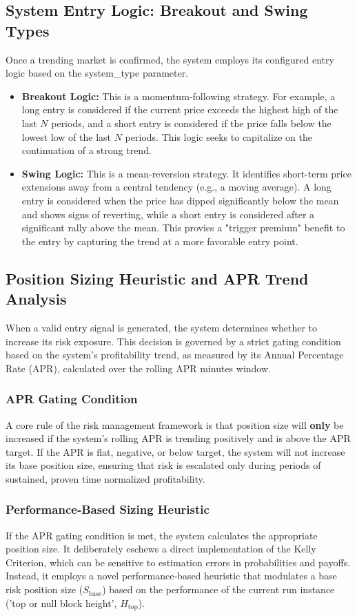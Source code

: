 \documentclass[10pt]{article}
\begin{document}
\subsection{System Entry Logic: Breakout and Swing Types}
Once a trending market is confirmed, the system employs its configured entry logic based on the system\_type parameter.
\begin{itemize}
    \item \textbf{Breakout Logic:} This is a momentum-following strategy. For example, a long entry is considered if the current price exceeds the highest high of the last $N$ periods, and a short entry is considered if the price falls below the lowest low of the last $N$ periods. This logic seeks to capitalize on the continuation of a strong trend.
    \item \textbf{Swing Logic:} This is a mean-reversion strategy. It identifies short-term price extensions away from a central tendency (e.g., a moving average). A long entry is considered when the price has dipped significantly below the mean and shows signs of reverting, while a short entry is considered after a significant rally above the mean. This provies a "trigger premium" benefit to the entry by capturing the trend at a more favorable entry point.
\end{itemize}

\subsection{Position Sizing Heuristic and APR Trend Analysis}
When a valid entry signal is generated, the system determines whether to increase its risk exposure. This decision is governed by a strict gating condition based on the system's profitability trend, as measured by its Annual Percentage Rate (APR), calculated over the rolling APR minutes window.

\subsubsection{APR Gating Condition}
A core rule of the risk management framework is that position size will \textbf{only} be increased if the system's rolling APR is trending positively and is above the APR target. If the APR is flat, negative, or below target, the system will not increase its base position size, ensuring that risk is escalated only during periods of sustained, proven time normalized profitability.

\subsubsection{Performance‑Based Sizing Heuristic}
If the APR gating condition is met, the system calculates the appropriate position size. It deliberately eschews a direct implementation of the Kelly Criterion\cite{kelly1956new,tharpinstitute_peak}, which can be sensitive to estimation errors in probabilities and payoffs. Instead, it employs a novel performance‑based heuristic that modulates a base risk position size ($S_{\text{base}}$) based on the performance of the current run instance ('top or null block height', $H_{\text{top}}$).
\end{document}
